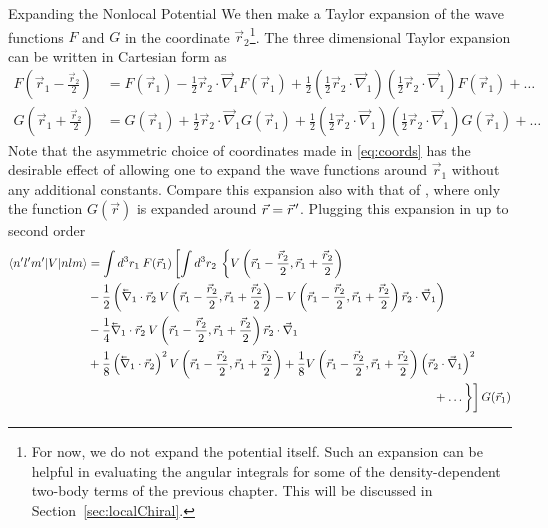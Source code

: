 \begin{section}{Expanding the Nonlocal Potential}
We then make a Taylor expansion of the wave functions $F$ and $G$ in the coordinate $\vec{r}_2$\footnote{For now, we do not expand the potential itself. Such an expansion can be helpful in evaluating the angular integrals for some of the density-dependent two-body terms of the previous chapter. This will be discussed in Section~\ref{sec:localChiral}.}. The three dimensional Taylor expansion can be written in Cartesian form as
\begin{align}\label{eq:TaylorExpansion}
F\left(\vec{r}_1-\frac{\vec{r}_2}{2}\right)&=F(\vec{r}_1)-\frac{1}{2}\vec{r}_2\cdot\vec{\nabla}_1 F(\vec{r}_1)+\frac{1}{2}\left(\frac{1}{2}\vec{r}_2\cdot\vec{\nabla}_1\right)\left(\frac{1}{2}\vec{r}_2\cdot\vec{\nabla}_1\right)F(\vec{r}_1)+\dots 
\\
G\left(\vec{r}_1+\frac{\vec{r}_2}{2}\right)&=G(\vec{r}_1)+\frac{1}{2}\vec{r}_2\cdot\vec{\nabla}_1 G(\vec{r}_1)+\frac{1}{2}\left(\frac{1}{2}\vec{r}_2\cdot\vec{\nabla}_1\right)\left(\frac{1}{2}\vec{r}_2\cdot\vec{\nabla}_1\right)G(\vec{r}_1)+\dots
\end{align}
Note that the asymmetric choice of coordinates made in \eqref{eq:coords} has the desirable effect of allowing one to expand the wave functions around $\vec{r}_1$ without any additional constants. Compare this expansion also with that of \cite{0954-3899-26-3-310}, where only the function $G(\vec{r})$ is expanded around $\vec{r}=\vec{r}\mkern2mu'$. Plugging this expansion in up to second order 
\begin{equation}\label{eq:expansionCartesian}
\begin{split}
\braket{n' l' m'| V | n l m} &= \int d^3r_1\: F(\vec{r}_1)\left[\int d^3r_2\:\left\{V\left(\vec{r}_1-\frac{\vec{r}_2}{2},\vec{r}_1+\frac{\vec{r}_2}{2}\right) \right.\right. \\
&-\frac{1}{2} \left(\lvec{\nabla}_1\cdot\vec{r}_2\: V\left(\vec{r}_1-\frac{\vec{r}_2}{2},\vec{r}_1+\frac{\vec{r}_2}{2}\right) -
V\left(\vec{r}_1-\frac{\vec{r}_2}{2},\vec{r}_1+\frac{\vec{r}_2}{2}\right) \vec{r}_2\cdot\vec{\nabla}_1
\right)\\
&-\frac{1}{4}\lvec{\nabla}_1\cdot\vec{r}_2\: V\left(\vec{r}_1-\frac{\vec{r}_2}{2},\vec{r}_1+\frac{\vec{r}_2}{2}\right) \vec{r}_2\cdot\vec{\nabla}_1\\
&+\frac{1}{8}\left(\lvec{\nabla}_{1}\cdot\vec{r}_2\right)^2 V\left(\vec{r}_1-\frac{\vec{r}_2}{2},\vec{r}_1+\frac{\vec{r}_2}{2}\right) 
+\frac{1}{8} V\left(\vec{r}_1-\frac{\vec{r}_2}{2},\vec{r}_1+\frac{\vec{r}_2}{2}\right) \left(\vec{r}_2\cdot\vec{\nabla}_{1}\right)^2 \\
&\hspace{10cm}\left.\left.\vphantom{V\left(\vec{r}_1-\frac{\vec{r}_2}{2},\vec{r}_1+\frac{\vec{r}_2}{2}\right)}+\dots \right\}\right]G(\vec{r}_1)
\end{split}
\end{equation}


\end{section}
